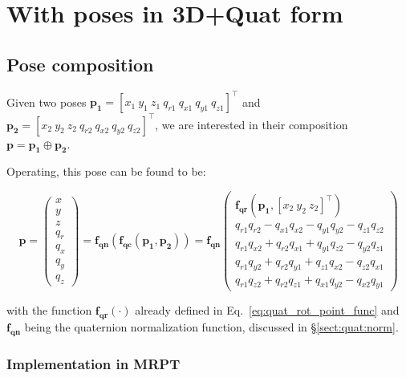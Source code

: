 \documentclass[a4paper,11pt]{report}
\begin{document}
\section{With poses in 3D+Quat form}

\subsection{Pose composition}

Given two poses
$\mathbf{p_1} = [x_1 ~ y_1 ~ z_1 ~  q_{r1} ~ q_{x1} ~ q_{y1} ~ q_{z1} ] ^ \top$
and
$\mathbf{p_2} = [x_2 ~ y_2 ~ z_2 ~  q_{r2} ~ q_{x2} ~ q_{y2} ~ q_{z2} ] ^ \top$,
we are interested in their composition $\mathbf{p}=\mathbf{p_1} \oplus \mathbf{p_2}$.

Operating, this pose can be found to be:

\begin{equation}
\mathbf{p} =
\left(\begin{array}{c}
 x \\ y \\ z \\ q_r \\ q_x \\ q_y \\ q_z
\end{array}\right)
= \mathbf{f_{qn}}\left(  \mathbf{f_{qc}}(\mathbf{p_1},\mathbf{p_2}) \right)
=
\mathbf{f_{qn}}
\left(\begin{array}{c}
  \mathbf{f_{qr}} (\mathbf{p_1}, [ x_2 ~ y_2 ~ z_2]^\top ) \\
q_{r1} q_{r2} - q_{x1} q_{x2} - q_{y1} q_{y2} - q_{z1} q_{z2} \\
q_{r1} q_{x2} + q_{r2} q_{x1} + q_{y1} q_{z2} - q_{y2} q_{z1} \\
q_{r1} q_{y2} + q_{r2} q_{y1} + q_{z1} q_{x2} - q_{z2} q_{x1} \\
q_{r1} q_{z2} + q_{r2} q_{z1} + q_{x1} q_{y2} - q_{x2} q_{y1}
\end{array}\right)
\end{equation}

\noindent with the function $\mathbf{f_{qr}}(\cdot)$ already defined in Eq.~\ref{eq:quat_rot_point_func}
and $\mathbf{f_{qn}}$ being the quaternion normalization function, discussed in
\S \ref{sect:quat:norm}.


\subsubsection{Implementation in MRPT}
\end{document}
